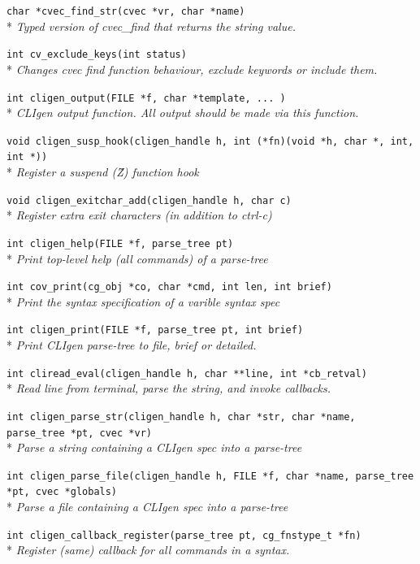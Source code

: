 \documentclass[a4paper, 10pt] {article}
\begin{document}
{{\tt char *cvec\_find\_str(cvec *vr, char *name)}\\*
\emph{  Typed version of cvec\_find that returns the string value.}

{\tt int cv\_exclude\_keys(int status)}\\*
\emph{ Changes cvec find function behaviour, exclude keywords or include them.}

{\tt int cligen\_output(FILE *f, char *template, ... )}\\*
\emph{ CLIgen output function. All output should be made via this function.}

{\tt void cligen\_susp\_hook(cligen\_handle h, int (*fn)(void *h, char *, int, int *))}\\*
\emph{ Register a suspend (\^Z) function hook }

{\tt void cligen\_exitchar\_add(cligen\_handle h, char c)}\\*
\emph{ Register extra exit characters (in addition to ctrl-c)}

{\tt int cligen\_help(FILE *f, parse\_tree pt)}\\*
\emph{ Print top-level help (all commands) of a parse-tree}

{\tt int cov\_print(cg\_obj *co, char *cmd, int len, int brief)}\\*
\emph{ Print the syntax specification of a varible syntax spec}

{\tt int cligen\_print(FILE *f, parse\_tree pt, int brief)}\\*
\emph{  Print CLIgen parse-tree to file, brief or detailed.}

{\tt int cliread\_eval(cligen\_handle h, char **line, int *cb\_retval)}\\*
\emph{ Read line from terminal, parse the string, and invoke callbacks.}

{\tt int cligen\_parse\_str(cligen\_handle h, char *str, char *name, parse\_tree *pt, cvec *vr)}\\*
\emph{ Parse a string containing a CLIgen spec into a parse-tree}

{\tt int cligen\_parse\_file(cligen\_handle h, FILE *f, char *name, parse\_tree *pt, cvec *globals)}\\*
\emph{ Parse a file containing a CLIgen spec into a parse-tree}

{\tt int cligen\_callback\_register(parse\_tree pt, cg\_fnstype\_t *fn)}\\*
\emph{  Register (same) callback for all commands in a syntax.}

}
\end{document}
